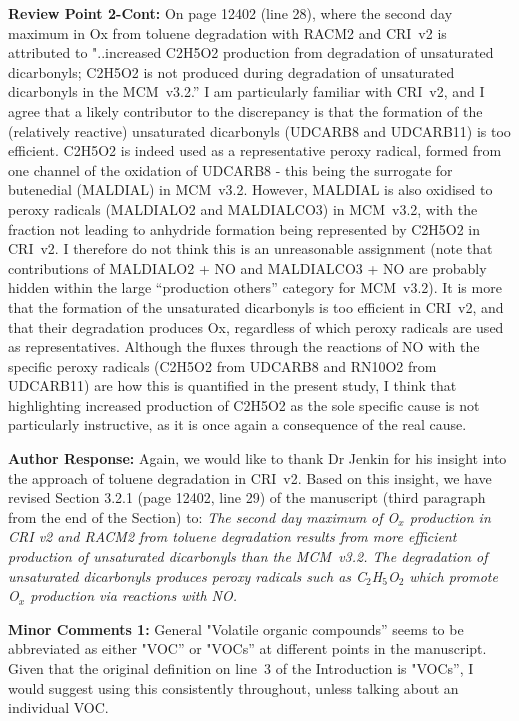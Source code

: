 \documentclass{article}
\begin{document}
\textbf{Review Point 2-Cont:} On page 12402 (line 28), where the second day maximum in Ox from toluene degradation with RACM2 and CRI~v2 is attributed to "..increased C2H5O2 production from degradation of unsaturated dicarbonyls; C2H5O2 is not produced during degradation of unsaturated dicarbonyls in the MCM~v3.2.'' I am particularly familiar with CRI~v2, and I agree that a likely contributor to the discrepancy is that the formation of the (relatively reactive) unsaturated dicarbonyls (UDCARB8 and UDCARB11) is too efficient. C2H5O2 is indeed used as a representative peroxy radical, formed from one channel of the oxidation of UDCARB8 - this being the surrogate for butenedial (MALDIAL) in MCM~v3.2. However, MALDIAL is also oxidised to peroxy radicals (MALDIALO2 and MALDIALCO3) in MCM~v3.2, with the fraction not leading to anhydride formation being represented by C2H5O2 in CRI~v2. I therefore do not think this is an unreasonable assignment (note that contributions of MALDIALO2 + NO and MALDIALCO3 + NO are probably hidden within the large ``production others'' category for MCM~v3.2). It is more that the formation of the unsaturated dicarbonyls is too efficient in CRI~v2, and that their degradation produces Ox, regardless of which peroxy radicals are used as representatives. Although the fluxes through the reactions of NO with the specific peroxy radicals (C2H5O2 from UDCARB8 and RN10O2 from UDCARB11) are how this is quantified in the present study, I think that highlighting increased production of C2H5O2 as the sole specific cause is not particularly instructive, as it is once again a consequence of the real cause.

\textbf{Author Response:} Again, we would like to thank Dr Jenkin for his insight into the approach of toluene degradation in CRI~v2.
Based on this insight, we have revised Section 3.2.1 (page 12402, line 29) of the manuscript (third paragraph from the end of the Section) to:
\textit{The second day maximum of O$_{x}$ production in CRI v2 and RACM2 from toluene degradation results from more efficient production of unsaturated dicarbonyls than the MCM~v3.2. The degradation of unsaturated dicarbonyls produces peroxy radicals such as C$_2$H$_5$O$_2$ which promote O$_{x}$ production via reactions with NO.}

\textbf{Minor Comments 1:} General "Volatile organic compounds'' seems to be abbreviated as either "VOC'' or "VOCs'' at different points in the manuscript. Given that the original definition on line~3 of the Introduction is "VOCs'', I would suggest using this consistently throughout, unless talking about an individual VOC.
\end{document}
